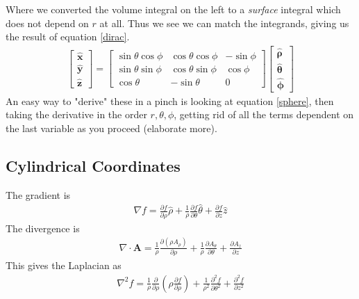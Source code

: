 Where we converted the volume integral on the left to a \emph{surface} integral which does not depend on $r$ at all. Thus we see we can match the integrands, giving us the result of equation \ref{dirac}.
\begin{align}
\begin{bmatrix}\mathbf{\hat x} \\ \mathbf{\hat y}  \\ \mathbf{\hat z} \end{bmatrix}
  = \begin{bmatrix} \sin\theta\cos\phi & \cos\theta\cos\phi & -\sin\phi \\
                    \sin\theta\sin\phi & \cos\theta\sin\phi &  \cos\phi \\
                    \cos\theta         & -\sin\theta        & 0 \end{bmatrix}
    \begin{bmatrix} \boldsymbol{\hat\rho} \\ \boldsymbol{\hat\theta} \\ \boldsymbol{\hat\phi} \end{bmatrix}
\end{align}
An easy way to "derive" these in a pinch is looking at equation \ref{sphere}, then taking the derivative in the order $r,\theta,\phi$, getting rid of all the terms dependent on the last variable as you proceed (elaborate more).


\subsection{Cylindrical Coordinates}
The gradient is
\begin{align}
\nabla f = \frac{\partial f}{\partial \rho}\hat{\rho} + \frac{1}{\rho}\frac{\partial f}{\partial \theta}\hat{\theta} + \frac{\partial f}{\partial z}\hat{z}
\end{align}
The divergence is
\begin{align}
\nabla\cdot\textbf{A} = \frac{1}{\rho}\frac{\partial \left( \rho A_\rho  \right)}{\partial \rho}
+ \frac{1}{\rho}\frac{\partial A_\theta}{\partial \theta}
+ \frac{\partial A_z}{\partial z}
\end{align}
This gives the Laplacian as
\begin{align}
\nabla^2 f = \frac{1}{\rho}\frac{\partial}{\partial \rho}\left(\rho \frac{\partial f}{\partial \rho}\right)
+ \frac{1}{\rho^2}\frac{\partial^2 f}{\partial \theta^2}
+ \frac{\partial^2 f}{\partial z^2}
\end{align}


